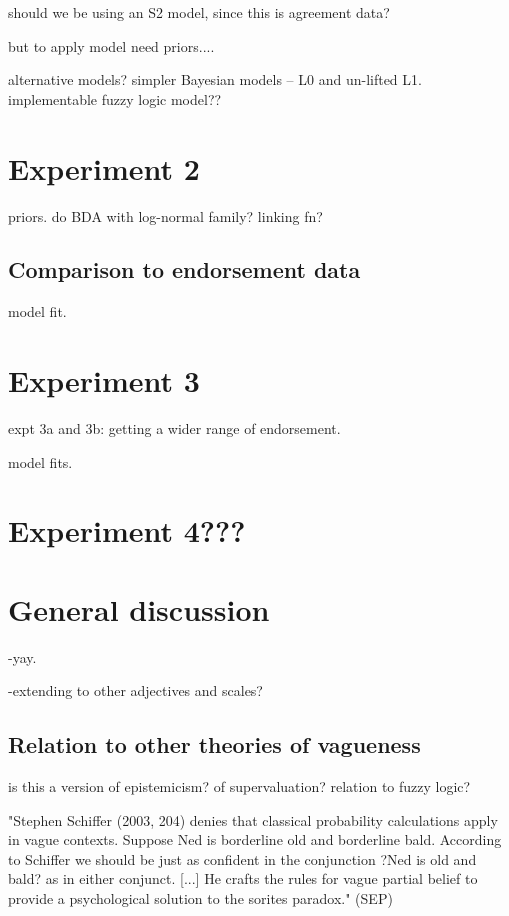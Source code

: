 \documentclass[11pt]{amsart}
\begin{document}
should we be using an S2 model, since this is agreement data?

but to apply model need priors....

alternative models? simpler Bayesian models -- L0 and un-lifted L1. implementable fuzzy logic model??

\section{Experiment 2}
\label{priors}
priors. do BDA with log-normal family? linking fn?

\subsection{Comparison to endorsement data}
model fit. 

\section{Experiment 3}
\label{exp3}

expt 3a and 3b: getting a wider range of endorsement. 

model fits.

\section{Experiment 4???}

\section{General discussion}
\label{gd}

  -yay. 
  
  -extending to other adjectives and scales?
  
 \subsection{Relation to other theories of vagueness}
  
is this a version of epistemicism? of supervaluation? relation to fuzzy logic?

"Stephen Schiffer (2003, 204) denies that classical probability calculations apply in vague contexts. Suppose Ned is borderline old and borderline bald. According to Schiffer we should be just as confident in the conjunction ?Ned is old and bald? as in either conjunct. [...] He crafts the rules for vague partial belief to provide a psychological solution to the sorites paradox." (SEP)
  
\end{document}
